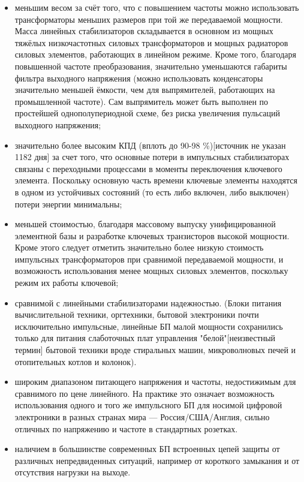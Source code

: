 \begin{itemize}
\item меньшим весом за счёт того, что с повышением частоты можно использовать трансформаторы меньших размеров при той же передаваемой мощности. Масса линейных стабилизаторов складывается в основном из мощных тяжёлых низкочастотных силовых трансформаторов и мощных радиаторов силовых элементов, работающих в линейном режиме. Кроме того, благодаря повышенной частоте преобразования, значительно уменьшаются габариты фильтра выходного напряжения (можно использовать конденсаторы значительно меньшей ёмкости, чем для выпрямителей, работающих на промышленной частоте). Сам выпрямитель может быть выполнен по простейшей однополупериодной схеме, без риска увеличения пульсаций выходного напряжения;
\item значительно более высоким КПД (вплоть до 90-98 \%)[источник не указан 1182 дня] за счет того, что основные потери в импульсных стабилизаторах связаны с переходными процессами в моменты переключения ключевого элемента. Поскольку основную часть времени ключевые элементы находятся в одном из устойчивых состояний (то есть либо включен, либо выключен) потери энергии минимальны;
\item меньшей стоимостью, благодаря массовому выпуску унифицированной элементной базы и разработке ключевых транзисторов высокой мощности. Кроме этого следует отметить значительно более низкую стоимость импульсных трансформаторов при сравнимой передаваемой мощности, и возможность использования менее мощных силовых элементов, поскольку режим их работы ключевой;
\item сравнимой с линейными стабилизаторами надежностью. (Блоки питания вычислительной техники, оргтехники, бытовой электроники почти исключительно импульсные, линейные БП малой мощности сохранились только для питания слаботочных плат управления "белой"[неизвестный термин] бытовой техники вроде стиральных машин, микроволновых печей и отопительных котлов и колонок).
\item широким диапазоном питающего напряжения и частоты, недостижимым для сравнимого по цене линейного. На практике это означает возможность использования одного и того же импульсного БП для носимой цифровой электроники в разных странах мира --- Россия/США/Англия, сильно отличных по напряжению и частоте в стандартных розетках.
\item наличием в большинстве современных БП встроенных цепей защиты от различных непредвиденных ситуаций, например от короткого замыкания и от отсутствия нагрузки на выходе.
\end{itemize}

